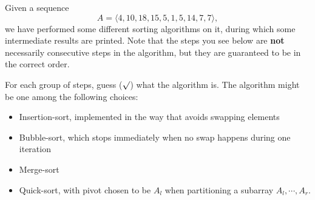 
Given a sequence
\[A=\langle 4,10,18,15,5,1,5,14,7,7\rangle,\]
we have performed some different sorting algorithms on it, during which some intermediate results are printed. Note that the steps you see below are \textbf{not} necessarily consecutive steps in the algorithm, but they are guaranteed to be in the correct order.

For each group of steps, guess (\(\surd\)) what the algorithm is. The algorithm might be one among the following choices:
\begin{itemize}
  \item Insertion-sort, implemented in the way that avoids swapping elements
  \item Bubble-sort, which stops immediately when no swap happens during one iteration
  \item Merge-sort
  \item Quick-sort, with pivot chosen to be \(A_l\) when partitioning a subarray \(A_l,\cdots,A_r\).
\end{itemize}


